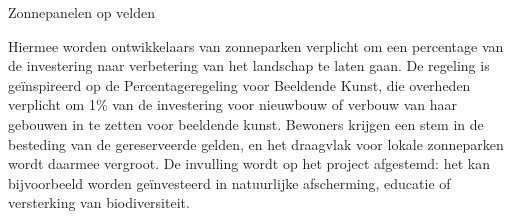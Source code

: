 \begin{voorstel}{Zonnepanelen op velden}
\begin{multicols}{2}
\begin{aanbevelingen}
Hiermee worden ontwikkelaars van zonneparken verplicht om een percentage van de investering naar verbetering van het landschap te laten gaan. De regeling is geïnspireerd op de Percentageregeling voor Beeldende Kunst, die overheden verplicht om 1\% van de investering voor nieuwbouw of verbouw van haar gebouwen in te zetten voor beeldende kunst.
Bewoners krijgen een stem in de besteding van de gereserveerde gelden, en het draagvlak voor lokale zonneparken wordt daarmee vergroot.
De invulling wordt op het project afgestemd: het kan bijvoorbeeld worden geïnvesteerd in natuurlijke afscherming, educatie of versterking van biodiversiteit.

\end{aanbevelingen}

\end{multicols}

\end{voorstel}


